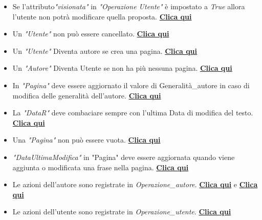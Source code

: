 \begin{itemize}
    
    \item {Se l'attributo\textit{"visionata"} in \textit{"Operazione Utente"} è impostato a \textit{True} allora l'utente non potrà modificare quella proposta. \hyperlink{Modificaproposta}{\textbf{Clica qui}}}\newline
    
    \item {Un \textit{"Utente"} non può essere cancellato.  \hyperlink{UtenteNoDelete}{\textbf{Clica qui}}}\newline
    
    \item {Un \textit{"Utente"} Diventa autore se crea una pagina. \hyperlink{SwitchAutore}{\textbf{Clica qui}}}\newline

    \item {Un \textit{"Autore"} Diventa Utente se non ha più nessuna pagina. \hyperlink{SwitchUtente}{\textbf{Clica qui}}}\newline
    
    \item { In \textit{"Pagina"} deve essere aggiornato il valore di Generalità\_autore in caso di modifica delle generalità dell'autore. \hyperlink{AggiornamentoGeneralitaPagina}{\textbf{Clica qui}}}\newline
    
    \item {La \textit{"DataR"} deve combaciare sempre con l'ultima Data di modifica del testo. \hyperlink{ModificaDataMod}{\textbf{Clica qui}}}\newline
    
    \item {Una \textit{"Pagina"} non può essere vuota.  \hyperlink{CreazionePagina}{\textbf{Clica qui}}}\newline

    \item {\textit{"DataUltimaModifica"} in "Pagina" deve essere aggiornata quando viene aggiunta o modificata una frase nella pagina. \hyperlink{DataModficaPagina}{\textbf{Clica qui}}}\newline
    
    \item {Le azioni dell'autore sono registrate in \textit{Operazione\_autore}. \hyperlink{OperazioneAutoreIntegritaMod}{\textbf{Clica qui}} e  \hyperlink{OperazioneAutoreIntegritaIns}{\textbf{Clica qui}}}\newline
    
    \item {Le azioni dell'utente sono registrate in \textit{Operazione\_utente}. \hyperlink{OperazioneUtenteRichiesta}{\textbf{Clica qui}}}
\end{itemize}